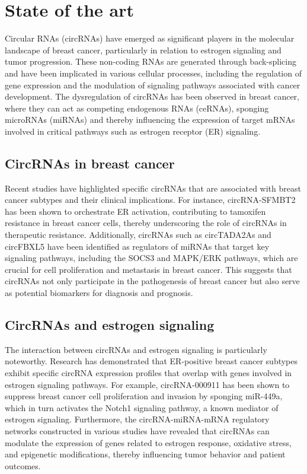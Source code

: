 \section{State of the art}
Circular RNAs (circRNAs) have emerged as significant players in the molecular
landscape of breast cancer, particularly in relation to estrogen signaling and
tumor progression.
These non-coding RNAs are generated through back-splicing and have been
implicated in various cellular processes, including the regulation of gene
expression and the modulation of signaling pathways associated with cancer
development\supercite{li_circrna-sfmbt2_2023,tran_new_2020}.
The dysregulation of circRNAs has been observed in breast cancer, where they
can act as competing endogenous RNAs (ceRNAs), sponging microRNAs (miRNAs) and
thereby influencing the expression of target mRNAs involved in critical
pathways such as estrogen receptor (ER)
signaling\supercite{nair_circular_2016,xu_circrna_2022}.

\subsection{CircRNAs in breast cancer}
Recent studies have highlighted specific circRNAs that are associated with
breast cancer subtypes and their clinical implications.
For instance, circRNA-SFMBT2 has been shown to orchestrate ER\textalpha{}
activation, contributing to tamoxifen resistance in breast cancer cells,
thereby underscoring the role of circRNAs in therapeutic
resistance\supercite{li_circrna-sfmbt2_2023}.
Additionally, circRNAs such as circTADA2As and circFBXL5 have been identified
as regulators of miRNAs that target key signaling pathways, including the SOCS3
and MAPK/ERK pathways, which are crucial for cell proliferation and metastasis
in breast cancer\supercite{xu_circtada2as_2019,gao_hsa_circrna_0006528_2019}.
This suggests that circRNAs not only participate in the pathogenesis of breast
cancer but also serve as potential biomarkers for diagnosis and
prognosis\supercite{liu_influence_2021,chen_circepsti1_2018}.

\subsection{CircRNAs and estrogen signaling}
The interaction between circRNAs and estrogen signaling is particularly
noteworthy.
Research has demonstrated that ER-positive breast cancer subtypes exhibit
specific circRNA expression profiles that overlap with genes involved in
estrogen signaling pathways\supercite{nair_circular_2016}.
For example, circRNA-000911 has been shown to suppress breast cancer cell
proliferation and invasion by sponging miR-449a, which in turn activates the
Notch1 signaling pathway, a known mediator of estrogen
signaling\supercite{wang_comprehensive_2018}.
Furthermore, the circRNA-miRNA-mRNA regulatory networks constructed in various
studies have revealed that circRNAs can modulate the expression of genes
related to estrogen response, oxidative stress, and epigenetic modifications,
thereby influencing tumor behavior and patient
outcomes\supercite{xu_circrna_2022,nair_circular_2016}.
